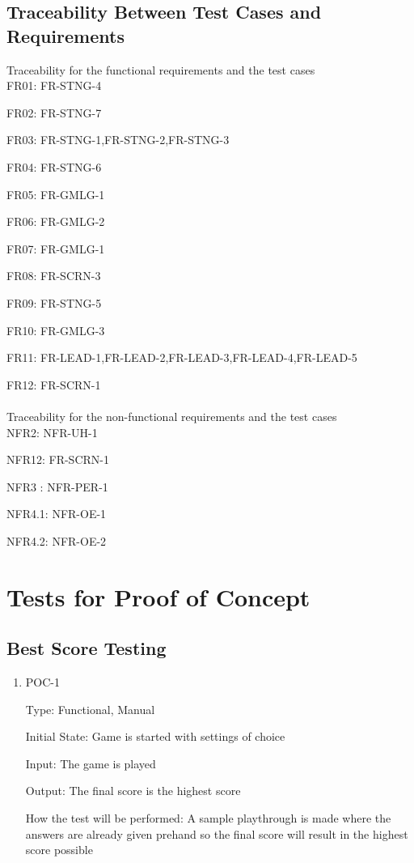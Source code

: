 \documentclass[12pt, titlepage]{article}
\begin{document}
\subsection{Traceability Between Test Cases and Requirements}
Traceability for the functional requirements and the test cases\\

FR01: FR-STNG-4

FR02: FR-STNG-7

FR03: FR-STNG-1,FR-STNG-2,FR-STNG-3

FR04: FR-STNG-6

FR05: FR-GMLG-1

FR06: FR-GMLG-2

FR07: FR-GMLG-1

FR08: FR-SCRN-3

FR09: FR-STNG-5

FR10: FR-GMLG-3

FR11: FR-LEAD-1,FR-LEAD-2,FR-LEAD-3,FR-LEAD-4,FR-LEAD-5

FR12: FR-SCRN-1\\
\\
Traceability for the non-functional requirements and the test cases\\

NFR2: NFR-UH-1

NFR12: FR-SCRN-1

NFR3 : NFR-PER-1 

NFR4.1: NFR-OE-1 

NFR4.2: NFR-OE-2



\section{Tests for Proof of Concept}

\subsection{Best Score Testing}
		
\begin{enumerate}

\item{POC-1\\}

Type: Functional, Manual

Initial State: Game is started with settings of choice

Input: The game is played 

Output: The final score is the highest score

How the test will be performed: A sample playthrough is made where the answers are already given prehand so the final score will result in the highest score possible				
\end{enumerate}
\end{document}

